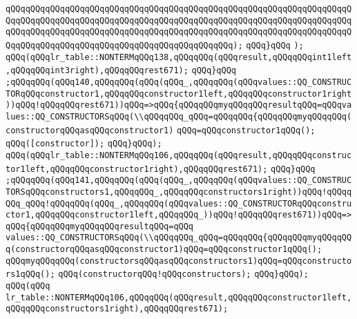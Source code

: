\verb|qQQqqQQqqQQqqQQqqQQqqQQqqQQqqQQqqQQqqQQqqQQqqQQqqQQqqQQqqQQqqQQqqQQqqQQqqQQqqQQqqQQqqQQqqQQqqQQqqQQqqQQqqQQqqQQqqQQqqQQqqQQqqQQqqQQqqQQqqQQqqQQqqQQqqQQqqQQqqQQqqQQqqQQqqQQqqQQqqQQqqQQqqQQqqQQqqQQqqQQqqQQqqQQqqQQqqQQqqQQqqQQqqQQqqQQqqQQqqQQqqQQqqQQqqQQqqQQq);|\newline
\verb|qQQq}qQQq|\newline
\verb|);|\newline
\verb|qQQq(qQQqlr_table::NONTERMqQQq138,qQQqqQQq(qQQqresult,qQQqqQQqint1left,qQQqqQQqint3right),qQQqqQQqrest671);|\newline
\verb|qQQq}qQQq|\newline
\verb|;qQQqqQQq(qQQq140,qQQqqQQq(qQQq(qQQq_,qQQqqQQq(qQQqvalues::QQ_CONSTRUCTORqQQqconstructor1,qQQqqQQqconstructor1left,qQQqqQQqconstructor1right))qQQq!qQQqqQQqrest671))qQQq=>qQQq{qQQqqQQqmyqQQqqQQqresultqQQq=qQQqvalues::QQ_CONSTRUCTORSqQQq(\\qQQqqQQq_qQQq=qQQqqQQq{qQQqqQQqmyqQQqqQQq(constructorqQQqasqQQqconstructor1)|\newline
\verb|qQQq=qQQqconstructor1qQQq();|\newline
\verb|qQQq([constructor]);|\newline
\verb|qQQq}qQQq);|\newline
\verb|qQQq(qQQqlr_table::NONTERMqQQq106,qQQqqQQq(qQQqresult,qQQqqQQqconstructor1left,qQQqqQQqconstructor1right),qQQqqQQqrest671);|\newline
\verb|qQQq}qQQq|\newline
\verb|;qQQqqQQq(qQQq141,qQQqqQQq(qQQq(qQQq_,qQQqqQQq(qQQqvalues::QQ_CONSTRUCTORSqQQqconstructors1,qQQqqQQq_,qQQqqQQqconstructors1right))qQQq!qQQqqQQq_qQQq!qQQqqQQq(qQQq_,qQQqqQQq(qQQqvalues::QQ_CONSTRUCTORqQQqconstructor1,qQQqqQQqconstructor1left,qQQqqQQq_))qQQq!qQQqqQQqrest671))qQQq=>qQQq{qQQqqQQqmyqQQqqQQqresultqQQq=qQQq|\newline
\verb|values::QQ_CONSTRUCTORSqQQq(\\qQQqqQQq_qQQq=qQQqqQQq{qQQqqQQqmyqQQqqQQq(constructorqQQqasqQQqconstructor1)qQQq=qQQqconstructor1qQQq();|\newline
\verb|qQQqmyqQQqqQQq(constructorsqQQqasqQQqconstructors1)qQQq=qQQqconstructors1qQQq();|\newline
\verb|qQQq(constructorqQQq!qQQqconstructors);|\newline
\verb|qQQq}qQQq);|\newline
\verb|qQQq(qQQq|\newline
\verb|lr_table::NONTERMqQQq106,qQQqqQQq(qQQqresult,qQQqqQQqconstructor1left,qQQqqQQqconstructors1right),qQQqqQQqrest671);|\newline
